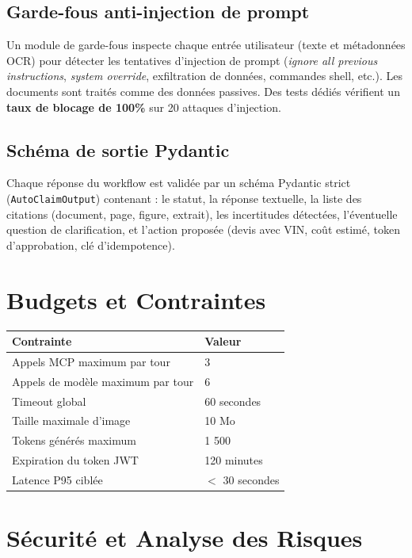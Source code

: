 \documentclass[11pt,a4paper]{article}
\begin{document}
\subsection{Garde-fous anti-injection de prompt}
Un module de garde-fous inspecte chaque entrée utilisateur (texte et métadonnées OCR) pour détecter les tentatives d'injection de prompt (\textit{ignore all previous instructions}, \textit{system override}, exfiltration de données, commandes shell, etc.). Les documents sont traités comme des données passives. Des tests dédiés vérifient un \textbf{taux de blocage de 100\%} sur 20 attaques d'injection.

\subsection{Schéma de sortie Pydantic}
Chaque réponse du workflow est validée par un schéma Pydantic strict (\texttt{AutoClaimOutput}) contenant : le statut, la réponse textuelle, la liste des citations (document, page, figure, extrait), les incertitudes détectées, l'éventuelle question de clarification, et l'action proposée (devis avec VIN, coût estimé, token d'approbation, clé d'idempotence).

\section{Budgets et Contraintes}

\begin{tabularx}{\textwidth}{l X}
\toprule
Contrainte & Valeur \\
\midrule
Appels MCP maximum par tour & 3 \\
Appels de modèle maximum par tour & 6 \\
Timeout global & 60 secondes \\
Taille maximale d'image & 10 Mo \\
Tokens générés maximum & 1 500 \\
Expiration du token JWT & 120 minutes \\
Latence P95 ciblée & $<$ 30 secondes \\
\bottomrule
\end{tabularx}

\section{Sécurité et Analyse des Risques}
\end{document}
